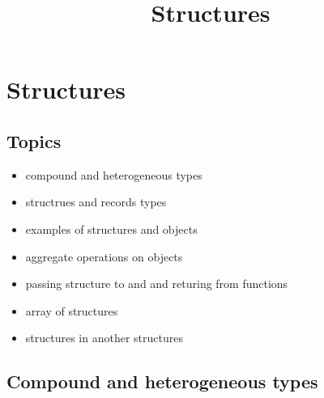 \documentclass[11pt]{article}
\title{Structures}
\providecommand{\tightlist}{%
      \setlength{\itemsep}{0pt}\setlength{\parskip}{0pt}}
\begin{document}
    
    \maketitle
    
    

    
    \hypertarget{structures}{%
\section{Structures}\label{structures}}

\hypertarget{topics}{%
\subsection{Topics}\label{topics}}

\begin{itemize}
\tightlist
\item
  compound and heterogeneous types
\item
  structrues and records types
\item
  examples of structures and objects
\item
  aggregate operations on objects
\item
  passing structure to and and returing from functions
\item
  array of structures
\item
  structures in another structures
\end{itemize}

    \hypertarget{compound-and-heterogeneous-types}{%
\subsection{Compound and heterogeneous
types}\label{compound-and-heterogeneous-types}}
\end{document}
